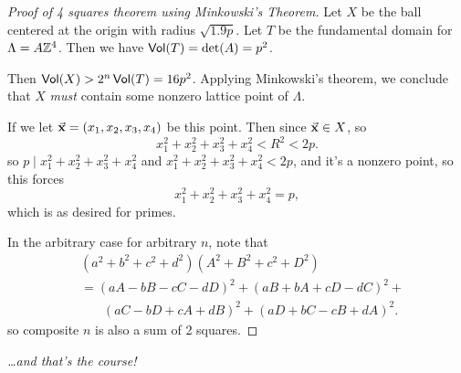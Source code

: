 \begin{proof}[Proof of 4 squares theorem using Minkowski's Theorem]
    Let $X$ be the ball centered at the origin with radius $\sqrt{1.9p}$. Let $T$ be the fundamental domain for $\Lambda = A\mathbb Z^4$. Then we have $\operatorname{\mathsf{Vol}}(T) = \det(A) = p^2$.

    Then $\operatorname{\mathsf{Vol}}(X) > 2^n\operatorname{\mathsf{Vol}}(T) = 16p^2$. Applying Minkowski's theorem, we conclude that $X$ \emph{must} contain some nonzero lattice point of $\Lambda$.

    If we let $\vec{\mathbf{x}} = (x_1, x_2, x_3, x_4)$ be this point. Then since $\vec{\mathbf{x}}\in X$, so
    \[x_1^2 + x_2^2 + x_3^2 + x_4^2 < R^2 < 2p.\]
    so $p\mid x_1^2 + x_2^2 + x_3^2 + x_4^2$ and $x_1^2 + x_2^2 + x_3^2 + x_4^2 < 2p$, and it's a nonzero point, so this forces
    \[x_1^2 + x_2^2 + x_3^2 + x_4^2 = p,\]
    which is as desired for primes.

    In the arbitrary case for arbitrary $n$, note that
    \begin{align*}
         & (a^2 + b^2 + c^2 + d^2)(A^2 + B^2 + c^2 + D^2)                \\
         & = (aA - bB - cC - dD)^2 + (aB + bA + cD - dC)^2 +             \\
         & \phantom{=}\ \ (aC - bD + cA + dB)^2 + (aD + bC - cB + dA)^2.
    \end{align*}
    so composite $n$ is also a sum of 2 squares.
\end{proof}

\begin{center}
    \emph{\dots and that's the course! }
\end{center}
